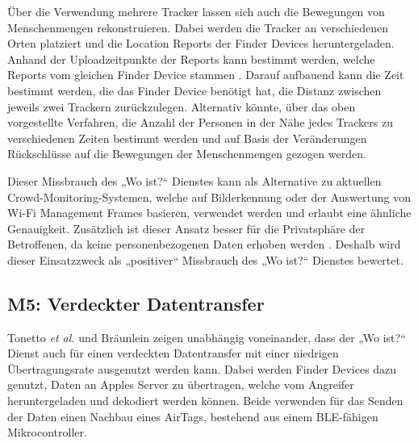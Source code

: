 Über die Verwendung mehrere Tracker lassen sich auch die Bewegungen von Menschenmengen rekonstruieren.
Dabei werden die Tracker an verschiedenen Orten platziert und die Location Reports der Finder Devices heruntergeladen.
Anhand der Uploadzeitpunkte der Reports kann bestimmt werden, welche Reports vom gleichen Finder Device stammen \cite{Tonetto_FindMy}.
Darauf aufbauend kann die Zeit bestimmt werden, die das Finder Device benötigt hat, die Distanz zwischen jeweils zwei Trackern zurückzulegen.
Alternativ könnte, über das oben vorgestellte Verfahren, die Anzahl der Personen in der Nähe jedes Trackers zu verschiedenen Zeiten bestimmt werden und auf Basis der Veränderungen Rückschlüsse auf die Bewegungen der Menschenmengen gezogen werden.


Dieser Missbrauch des „Wo ist?“ Dienstes kann als Alternative zu aktuellen Crowd-Monitoring-Systemen, welche auf Bilderkennung oder der Auswertung von Wi-Fi Management Frames basieren, verwendet werden und erlaubt eine ähnliche Genauigkeit.
Zusätzlich ist dieser Ansatz besser für die Privatsphäre der Betroffenen, da keine personenbezogenen Daten erhoben werden \cite{Tonetto_FindMy}.
Deshalb wird dieser Einsatzzweck als „positiver“ Missbrauch des „Wo ist?“ Dienstes bewertet.


\subsection[M5]{M5: Verdeckter Datentransfer}
\label{missbrauch:5}
Tonetto \textit{et al.} \cite{Tonetto_FindMy} und Bräunlein \cite{braeunlein_sendmy} zeigen unabhängig voneinander, dass der „Wo ist?“ Dienst auch für einen verdeckten Datentransfer mit einer niedrigen Übertragungsrate ausgenutzt werden kann.
Dabei werden Finder Devices dazu genutzt, Daten an Apples Server zu übertragen, welche vom Angreifer heruntergeladen und dekodiert werden können.
Beide verwenden für das Senden der Daten einen Nachbau eines AirTags, bestehend aus einem \ac{BLE}-fähigen Mikrocontroller.

